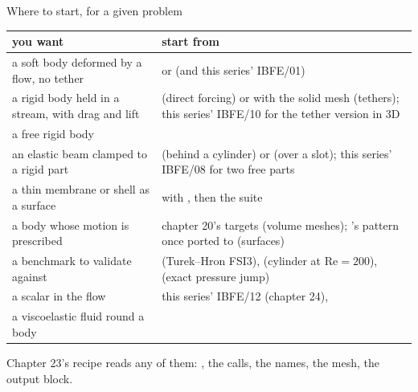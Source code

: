 \documentclass[aspectratio=169,11pt]{beamer}
\begin{document}
\begin{frame}{Where to start, for a given problem}
\label{fr:start}
\footnotesize
\begin{tabular}{@{}L{0.42\textwidth}L{0.5\textwidth}@{}}
\toprule
you want & start from \\
\midrule
a soft body deformed by a flow, no tether &  or  (and this series' IBFE/01) \\
a rigid body held in a stream, with drag and lift &  (direct forcing) or  with the solid mesh (tethers); this series' IBFE/10 for the tether version in 3D \\
a free rigid body &  \\
an elastic beam clamped to a rigid part &  (behind a cylinder) or  (over a slot); this series' IBFE/08 for two free parts \\
a thin membrane or shell as a surface &  with , then the  suite \\
a body whose motion is prescribed & chapter 20's targets (volume meshes); 's pattern once ported to  (surfaces) \\
a benchmark to validate against &  (Turek--Hron FSI3),  (cylinder at $\mathrm{Re} = 200$),  (exact pressure jump) \\
a scalar in the flow & this series' IBFE/12 (chapter 24),  \\
a viscoelastic fluid round a body &  \\
\bottomrule
\end{tabular}

\medskip
Chapter 23's recipe reads any of them: , the  calls, the  names, the mesh, the output block.
\end{frame}
\end{document}
